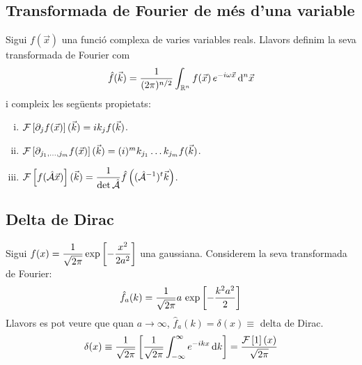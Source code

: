 \subsection{Transformada de Fourier de més d'una variable}
\begin{defi}
    Sigui $f(\vec{x})$ una funció complexa de varies variables reals. Llavors definim la seva transformada de Fourier com
    \begin{align}
        \hat{f}(\vec{k}) = \frac{1}{(2\pi)^{n/2}} \int_{\mathbb{R}^{n}} f(\vec{x})\,e^{-i \omega \vec{x}} \mathop{}\!\mathrm{d}^{n} \vec{x}
    \end{align}
    i compleix les següents propietats:
    \begin{enumerate}[i)]
        \item $\mathcal{F}\left[ \partial_{j} f(\vec{x}) \right](\vec{k}) = i k_{j} f(\vec{k})$.
        \item $\mathcal{F}\left[ \partial_{j_{1}, \dots, j_{m}} f(\vec{x}) \right](\vec{k}) = (i)^{m} k_{j_{1}} \dots k_{j_{m}} f(\vec{k})$.
        \item $\displaystyle \mathcal{F}\left[ f(\hat{\mathcal{A}} \vec{x}) \right](\vec{k}) = \frac{1}{\det \hat{\mathcal{A}}} \hat{f}\left( (\hat{\mathcal{A}}^{-1})^{t} \vec{k} \right)$.
    \end{enumerate}
\end{defi}

\subsection{Delta de Dirac}
\begin{defi}
    Sigui $f(x) = \dfrac{1}{\sqrt{2\pi}} \exp \left[ -\dfrac{x^{2}}{2a^{2}} \right]$ una gaussiana. Considerem la seva transformada de Fourier:
    \begin{align}
        \hat{f}_{a}(k) = \frac{1}{\sqrt{2\pi}} a \, \exp \left[ -\frac{k^{2}a^{2}}{2} \right]
    \end{align}
    Llavors es pot veure que quan $a \to \infty$, $\hat{f}_{a}(k) = \delta(x) \equiv$ delta de Dirac.
    \begin{align}
        \delta(x) \equiv \frac{1}{\sqrt{2\pi}} \left[ \frac{1}{\sqrt{2\pi}} \int_{-\infty}^{\infty} e^{-ikx} \mathop{}\!\mathrm{d} k \right] = \frac{\mathcal{F}\left[ 1 \right](x)}{\sqrt{2\pi}}
    \end{align}
\end{defi}

